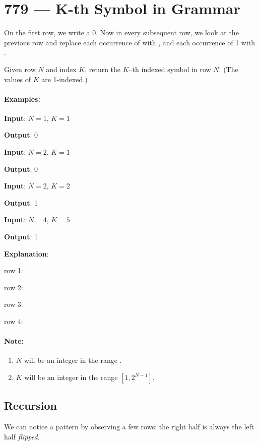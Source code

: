 \section{779 --- K-th Symbol in Grammar}
On the first row, we write a 0. Now in every subsequent row, we look at the previous row and replace each occurrence of  with , and each occurrence of 1 with .

Given row $N$ and index $K$, return the $K$--th indexed symbol in row $N$. (The values of $K$ are 1-indexed.)

\paragraph{Examples:}
\begin{flushleft}
\textbf{Input}: $N = 1$, $K = 1$

\textbf{Output}: 0

\textbf{Input}: $N = 2$, $K = 1$

\textbf{Output}: 0

\textbf{Input}: $N = 2$, $K = 2$

\textbf{Output}: 1

\textbf{Input}: $N = 4$, $K = 5$

\textbf{Output}: 1


\textbf{Explanation}:

row 1: 

row 2: 

row 3: 

row 4: 

\end{flushleft}

\paragraph{Note:}

\begin{enumerate}
\item $N$ will be an integer in the range \fcj{[1, 30]}.
\item $K$ will be an integer in the range $[1, 2^{N-1}]$.
\end{enumerate}

\subsection{Recursion}
We can notice a pattern by observing a few rows: the right half is always the left half \textit{flipped}.

